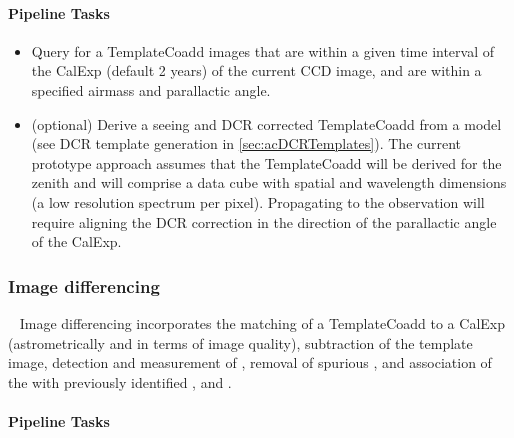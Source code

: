 \paragraph{Pipeline Tasks}

\begin{itemize}
\item Query for a TemplateCoadd images that are within a given time interval of the CalExp  (default 2 years) of the current CCD image, and are within a specified airmass and parallactic angle.
\item (optional) Derive a seeing and DCR corrected TemplateCoadd from a model (see DCR template generation in \ref{sec:acDCRTemplates}). The current prototype approach assumes that the TemplateCoadd  will be derived for the zenith and will comprise a data cube with spatial and wavelength dimensions (a low resolution spectrum per pixel). Propagating to the observation will require aligning the DCR correction in the direction of the parallactic angle of the CalExp.
\end{itemize}

\subsubsection{Image differencing}~
Image differencing incorporates the matching of a TemplateCoadd to a CalExp (astrometrically and in terms of image quality), subtraction of the template image, detection and measurement of \DIASources, removal of spurious \DIASources, and association of the \DIASources with previously identified \DIAObjects, and \SSObjects. 

\paragraph{Pipeline Tasks}

